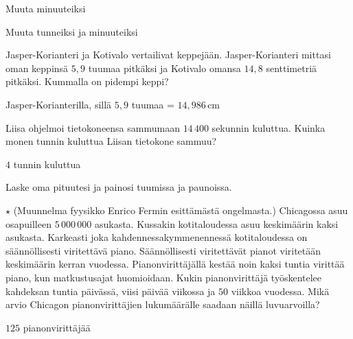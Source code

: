 \begin{tehtavasivu}
\begin{tehtava}
Muuta minuuteiksi
\begin{vastaus}
\end{vastaus}
\end{tehtava}

\begin{tehtava}
Muuta tunneiksi ja minuuteiksi
\begin{vastaus}
\end{vastaus}
\end{tehtava}

\begin{tehtava}
Jasper-Korianteri ja Kotivalo vertailivat keppejään. Jasper-Korianteri mittasi oman keppinsä $5,9$ tuumaa pitkäksi ja Kotivalo omansa $14,8$ senttimetriä pitkäksi. Kummalla on pidempi keppi?
\begin{vastaus}
Jasper-Korianterilla, sillä $5,9$ tuumaa = $14,986$\,cm
\end{vastaus}
\end{tehtava}

\begin{tehtava}
Liisa ohjelmoi tietokoneensa sammumaan $14\,400$ sekunnin kuluttua. Kuinka monen tunnin kuluttua Liisan tietokone sammuu?
\begin{vastaus}
$4$ tunnin kuluttua
\end{vastaus}
\end{tehtava}

\begin{tehtava}
Laske oma pituutesi ja painosi tuumissa ja paunoissa. %
\end{tehtava}

\begin{tehtava}
$\star$ (Muunnelma fyysikko Enrico Fermin esittämästä ongelmasta.) Chicagossa asuu osapuilleen $5\,000\,000$ asukasta. Kussakin kotitaloudessa asuu keskimäärin kaksi asukasta. Karkeasti joka kahdennessakymmenennessä kotitaloudessa on säännöllisesti viritettävä piano. Säännöllisesti viritettävät pianot viritetään keskimäärin kerran vuodessa. Pianonvirittäjällä kestää noin kaksi tuntia virittää piano, kun matkustusajat huomioidaan. Kukin pianonvirittäjä työskentelee kahdeksan tuntia päivässä, viisi päivää viikossa ja $50$ viikkoa vuodessa. Mikä arvio Chicagon pianonvirittäjien lukumäärälle saadaan näillä luvuarvoilla?
\begin{vastaus}
$125$ pianonvirittäjää
\end{vastaus}
\end{tehtava}

\end{tehtavasivu}